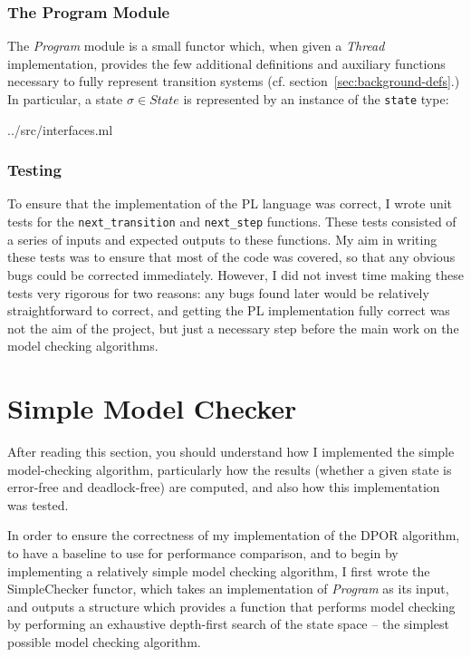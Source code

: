 \documentclass[12pt,a4paper,twoside,openright]{report}
\begin{document}
\subsubsection{The Program Module}
The \emph{Program} module is a small functor which,
when given a \emph{Thread} implementation, provides 
the few additional definitions and auxiliary
functions necessary to fully represent
transition systems (cf. section~\ref{sec:background-defs}.)
In particular, a state $\sigma \in \textit{State}$ is
represented by an instance of the \texttt{state} type:

	{../src/interfaces.ml}

\subsubsection{Testing}
To ensure that the implementation of the PL
language was correct, I wrote unit tests for
the \texttt{next\_transition} and
\texttt{next\_step} functions. These tests
consisted of a series of inputs and expected outputs
to these functions. My aim in writing these tests
was to ensure that most of the code was covered,
so that any obvious bugs could be corrected
immediately. However, I did not invest time
making these tests very rigorous for two reasons:
any bugs found later would be relatively straightforward
to correct, and getting the PL implementation
fully correct was not the aim of the project, but
just a necessary step before the main work on the
model checking algorithms.

\section{Simple Model Checker}
After reading this section, you
should understand how I implemented
the simple model-checking algorithm,
particularly how the results (whether
a given state is error-free and
deadlock-free) are computed,
and also how this implementation
was tested.

In order to ensure the correctness of my implementation
of the DPOR algorithm, to have a baseline to use
for performance comparison, and to begin by implementing
a relatively simple model checking algorithm, I first wrote the
SimpleChecker functor, which takes an implementation of
\emph{Program} as its input, and outputs a structure
which provides
a function that performs model checking by performing
an exhaustive depth-first search of the state space --
the simplest possible model checking algorithm.
\end{document}

